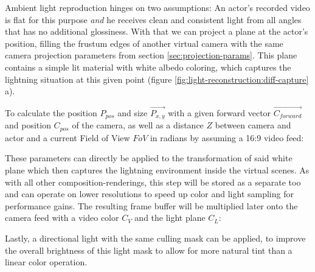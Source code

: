 Ambient light reproduction hinges on two assumptions: An actor's recorded video 
is flat for this purpose \textit{and} he receives clean and consistent light 
from all angles that has no additional glossiness. With that we can project a 
plane at the actor's position, filling the frustum edges of another virtual 
camera with the same camera projection parameters from section 
\ref{sec:projection-params}. This plane contains a simple lit material with 
white albedo coloring, which captures the lightning situation at this given 
point (figure \ref{fig:light-reconstruction:diff-capture} a).

To calculate the position $P_{pos}$ and size $\vec{P_{x, y}}$ with a 
given forward vector $\vec{C_{forward}}$ and position $C_{pos}$ of the 
camera, as well as a distance $Z$ between camera and actor and a current Field 
of View $FoV$ in radians by assuming a 16:9 video feed:



These parameters can directly be applied to the transformation of said white 
plane which then captures the lightning environment inside the virtual scenes. 
As with all other composition-renderings, this step will be stored as a 
separate  too and can operate on lower resolutions to speed 
up color and light sampling for performance gains.
\newline
The resulting frame buffer will be multiplied later onto the camera feed with a 
video color $C_V$ and the light plane $C_L$:


Lastly, a directional light with the same culling mask can be applied, to 
improve the overall brightness of this light mask to allow for more natural 
tint than a linear color operation.

